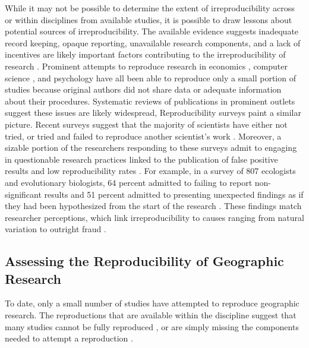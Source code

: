 \documentclass[]{interact}
\theoremstyle{plain}%
\theoremstyle{definition}
\theoremstyle{remark}
\begin{document}
While it may not be possible to determine the extent of irreproducibility across or within disciplines from available studies, it is possible to draw lessons about potential sources of irreproducibility.
The available evidence suggests inadequate record keeping, opaque reporting, unavailable research components, and a lack of incentives are likely important factors contributing to the irreproducibility of research \citep{NASEM2019}. 
Prominent attempts to reproduce research in economics \citep{chang2015economics}, computer science \citep{moraila2014measuring}, and psychology \citep{open2015estimating} have all been able to reproduce only a small portion of studies because original authors did not share data or adequate information about their procedures. 
Systematic reviews of publications in prominent outlets \citep{byrne_2017,stodden2018empirical} suggest these issues are likely widespread, 
Reproducibility surveys paint a similar picture. 
Recent surveys suggest that the majority of scientists have either not tried, or tried and failed to reproduce another scientist's work \citep{baker20161, boulbes2018survey}. 
Moreover, a sizable portion of the researchers responding to these surveys admit to engaging in questionable research practices linked to the publication of false positive results and low reproducibility rates \citep{fanelli2009many, fraser2018questionable}.
For example, in a survey of 807 ecologists and evolutionary biologists, 64 percent admitted to failing to report non-significant results and 51 percent admitted to presenting unexpected findings as if they had been hypothesized from the start of the research \citep{fraser2018questionable}.  
These findings match researcher perceptions, which link irreproducibility to causes ranging from natural variation to outright fraud \citep{ranstam2000fraud, anderson2007normative, baker20161}. 


\subsection*{Assessing the Reproducibility of Geographic Research}
To date, only a small number of studies have attempted to reproduce geographic research.
The reproductions that are available within the discipline suggest that many studies cannot be fully reproduced \citep{Kedron2021ssrn, nust2018, ostermann2021}, or are simply missing the components needed to attempt a reproduction \citep{Kedron_VijayanRP, konkol2019, ostermann2021}.
\end{document}
